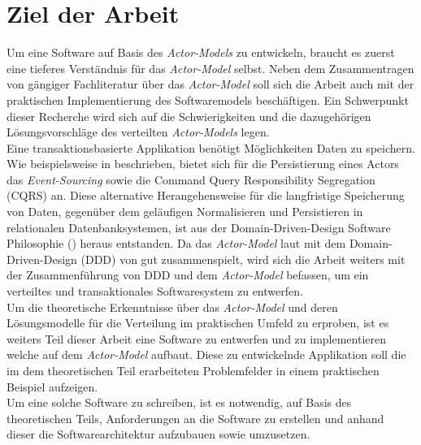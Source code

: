 \section{Ziel der Arbeit}\label{sec:introduction:workGoal}
Um eine Software auf Basis des \textit{Actor-Models} zu entwickeln, braucht es zuerst eine tieferes Verständnis für das \textit{Actor-Model}  selbst.  Neben dem Zusammentragen  von gängiger Fachliteratur über das \textit{Actor-Model} soll sich die Arbeit auch mit der praktischen Implementierung des Softwaremodels beschäftigen. Ein Schwerpunkt dieser Recherche wird sich auf die Schwierigkeiten und die dazugehörigen Lösungsvorschläge des verteilten \textit{Actor-Models}  legen. \\
Eine transaktionsbasierte Applikation benötigt Möglichkeiten Daten zu speichern. Wie beispielsweise in \cite{Vernon2015ReactiveAkka} beschrieben, bietet sich für die Persistierung eines Actors das \textit{Event-Sourcing} sowie die {Command Query Responsibility Segregation (CQRS)} an. Diese alternative Herangehensweise für die langfristige Speicherung von Daten, gegenüber dem geläufigen Normalisieren und Persistieren in relationalen Datenbanksystemen, ist aus der Domain-Driven-Design Software Philosophie (\cite{Evans2004Domain-drivenSoftware}) heraus  entstanden. Da das \textit{Actor-Model} laut \cite{Vernon2015ReactiveAkka} mit dem {Domain-Driven-Design} (DDD) von \citep{Evans2004Domain-drivenSoftware} gut zusammenspielt, wird sich die Arbeit weiters mit der Zusammenführung von DDD und dem \textit{Actor-Model}  befassen, um ein verteiltes und transaktionales Softwaresystem zu entwerfen. \\
Um die theoretische Erkenntnisse über das \textit{Actor-Model}  und deren Lösungsmodelle für die Verteilung im praktischen Umfeld zu erproben, ist es weiters Teil dieser Arbeit eine Software zu entwerfen und zu implementieren welche auf dem \textit{Actor-Model} aufbaut. Diese zu entwickelnde Applikation soll die im dem theoretischen Teil erarbeiteten Problemfelder in einem praktischen Beispiel aufzeigen. \\
Um eine solche Software zu schreiben, ist es notwendig, auf Basis des theoretischen Teils, Anforderungen an die Software zu erstellen und anhand dieser die Softwarearchitektur aufzubauen sowie umzusetzen. 

